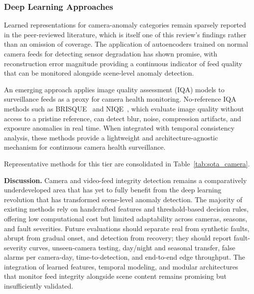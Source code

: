\documentclass[10pt,a4paper]{article}
\begin{document}
\subsubsection{Deep Learning Approaches}

Learned representations for camera-anomaly categories remain sparsely reported in the peer-reviewed literature, which is itself one of this review's findings rather than an omission of coverage. The application of autoencoders trained on normal camera feeds for detecting sensor degradation has shown promise, with reconstruction error magnitude providing a continuous indicator of feed quality that can be monitored alongside scene-level anomaly detection.

An emerging approach applies image quality assessment (IQA) models to surveillance feeds as a proxy for camera health monitoring. No-reference IQA methods such as BRISQUE~\citep{mittal2012brisque} and NIQE~\citep{mittal2013niqe}, which evaluate image quality without access to a pristine reference, can detect blur, noise, compression artifacts, and exposure anomalies in real time. When integrated with temporal consistency analysis, these methods provide a lightweight and architecture-agnostic mechanism for continuous camera health surveillance.




Representative methods for this tier are consolidated in Table~\ref{tab:sota_camera}.

\textbf{Discussion.} Camera and video-feed integrity detection remains a comparatively underdeveloped area that has yet to fully benefit from the deep learning revolution that has transformed scene-level anomaly detection. The majority of existing methods rely on handcrafted features and threshold-based decision rules, offering low computational cost but limited adaptability across cameras, seasons, and fault severities. Future evaluations should separate real from synthetic faults, abrupt from gradual onset, and detection from recovery; they should report fault-severity curves, unseen-camera testing, day/night and seasonal transfer, false alarms per camera-day, time-to-detection, and end-to-end edge throughput. The integration of learned features, temporal modeling, and modular architectures that monitor feed integrity alongside scene content remains promising but insufficiently validated.
\end{document}

